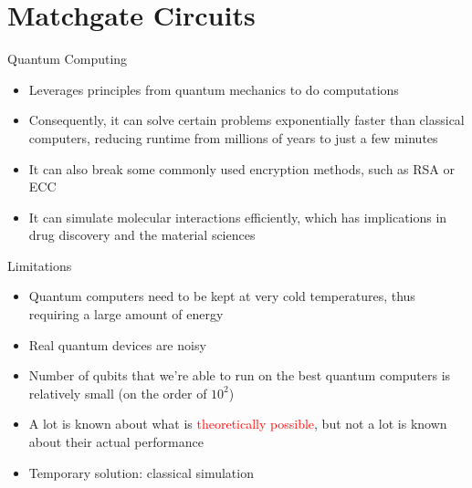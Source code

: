 \documentclass[xcolor=dvipsnames]{beamer}
\begin{document}
\section{Matchgate Circuits}

\begin{frame}{Quantum Computing}
  
  \begin{itemize}
    \item Leverages principles from quantum mechanics to do computations
    \item Consequently, it can solve certain problems exponentially faster than classical computers, reducing runtime from millions of years to just a few minutes
    \item It can also break some commonly used encryption methods, such as RSA or ECC
    \item It can simulate molecular interactions efficiently, which has implications in drug discovery and the material sciences
  \end{itemize}

\end{frame}

\begin{frame}{Limitations}

  \begin{itemize}
    \item Quantum computers need to be kept at very cold temperatures, thus requiring a large amount of energy
    \item Real quantum devices are noisy
    \item Number of qubits that we're able to run on the best quantum computers is relatively small (on the order of $10^2$)
    \item A lot is known about what is \textcolor{red}{theoretically possible}, but not a lot is known about their actual performance 
    \item Temporary solution: classical simulation 
  \end{itemize}
  
\end{frame}
\end{document}
